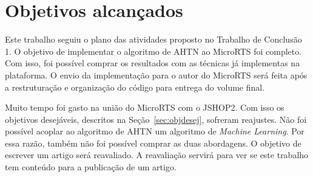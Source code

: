 \section{Objetivos alcançados}

Este trabalho seguiu o plano das atividades proposto no Trabalho de Conclusão 1.
O objetivo de implementar o algoritmo de AHTN ao MicroRTS foi completo.
Com isso, foi possível comprar os resultados com as técnicas já implementas na plataforma.
O envio da implementação para o autor do MicroRTS será feita após a restruturação e organização do código para entrega do volume final.

Muito tempo foi gasto na união do MicroRTS com o JSHOP2. 
Com isso os objetivos desejáveis, descritos na Seção~\ref{sec:objdesej}, sofreram reajustes.
Não foi possível acoplar ao algoritmo de AHTN um algoritmo de \textit{Machine Learning}.
Por essa razão, também não foi possível comprar as duas abordagens.
O objetivo de escrever um artigo será reavaliado.
A reavaliação servirá para ver se este trabalho tem conteúdo para a publicação de um artigo.




